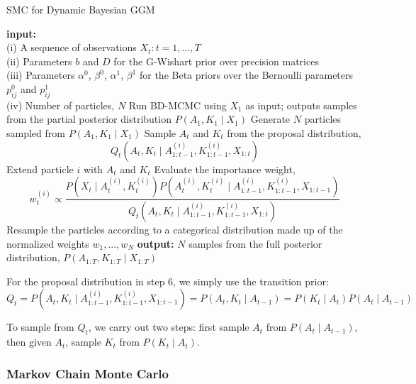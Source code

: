 \documentclass{article}
\begin{document}
\begin{algorithm}[h!tbp]
\caption{SMC for Dynamic Bayesian GGM}
\label{alg:smc}
\begin{algorithmic}[1]
\STATE \textbf{input:} \\(i) A sequence of observations $X_t : t = 1,...,T$ \\(ii) Parameters $b$ and $D$ for the G-Wishart prior over precision matrices \\(iii) Parameters $\alpha^0$, $\beta^0$, $\alpha^1$, $\beta^1$ for the Beta priors over the Bernoulli parameters $p_{ij}^0$ and $p_{ij}^1$ \\(iv) Number of particles, $N$
\STATE Run BD-MCMC using $X_1$ as input; outputs samples from the partial posterior distribution $P(A_1,K_1 \mid X_1)$
\STATE Generate $N$ particles sampled from $P(A_1,K_1 \mid X_1)$
\STATE Sample $A_t$ and $K_t$ from the proposal distribution, $$Q_t(A_t,K_t \mid A_{1:t-1}^{(i)},K_{1:t-1}^{(i)},X_{1:t})$$
\STATE Extend particle $i$ with $A_t$ and $K_t$
\STATE Evaluate the importance weight, $$w_t^{(i)} \propto \frac{P(X_t \mid A_t^{(i)}, K_t^{(i)}) P(A_t^{(i)}, K_t^{(i)} \mid A_{1:t-1}^{(i)}, K_{1:t-1}^{(i)}, X_{1:t-1})}{Q_t(A_t,K_t \mid A_{1:t-1}^{(i)},K_{1:t-1}^{(i)},X_{1:t})}$$
\ENDFOR
\STATE Resample the particles according to a categorical distribution made up of the normalized weights $w_1,...,w_N$
\ENDFOR
\STATE \textbf{output:} $N$ samples from the full posterior distribution, $P(A_{1:T},K_{1:T} \mid X_{1:T})$
\end{algorithmic}
\label{alg:smc}
\end{algorithm}

For the proposal distribution in step 6, we simply use the transition prior: 
$$Q_t = P(A_t, K_t \mid A_{1:t-1}^{(i)},K_{1:t-1}^{(i)},X_{1:t-1}) = P(A_t, K_t \mid A_{t-1}) = P(K_t \mid A_t) P(A_t \mid A_{t-1})$$

To sample from $Q_t$, we carry out two steps: first sample $A_t$ from $P(A_t \mid A_{t-1})$, then given $A_t$, sample $K_t$ from $P(K_t \mid A_t)$.

\subsubsection{Markov Chain Monte Carlo}
\end{document}
